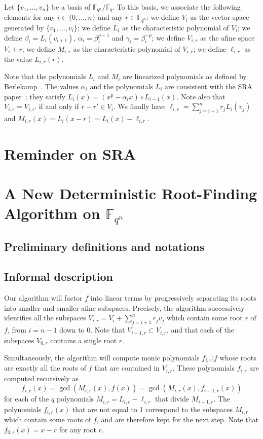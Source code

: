 \documentclass{sig-alternate}
\newcommand{\ff}[1]{\mathbb{F}_{#1}}
\newcommand{\fq}{\ff{q}}
\newcommand{\fqn}{\ff{q^n}}
\newcommand{\basefsize}{q}
\newcommand{\extfdegree}{n}
\newcommand{\extfsize}{\basefsize^\extfdegree}
\newcommand{\extf}{\ff{\extfsize}}
\newcounter{algo}
\begin{document}
Let $\{v_1,\ldots,v_\extfdegree\}$ be a basis of $\fqn/\fq$. To this basis, we associate the following elements for any $i\in\{0,\ldots,\extfdegree\}$ and any $r\in\fqn$: 
we define $V_i$ as the vector space generated by $\{v_1,\ldots,v_i\}$;
we define $L_i$ as the characteristic polynomial of $V_i$;
we define $\beta_i=L_i(v_{i+1})$, $\alpha_i=\beta_i^{p-1}$ and $\gamma_i=\beta_i^{-p}$;
we define $V_{i,r}$ as the afine space $V_i+r$;
we define $M_{i,r}$ as the characteristic polynomial of $V_{i,r}$;
we define $\ell_{i,r}$ as the value $L_{i,r}(r)$.

Note that the polynomials $L_i$ and $M_i$ are linearized polynomials as defined by Berlekamp~\cite[Ch. 11]{Berlekamp1984}. The values $\alpha_i$ and the polynomials $L_i$ are consistent with the SRA paper~\cite{cgUCL-P14}; they satisfy $L_i(x)=(x^p-\alpha_ix)\circ L_{i-1}(x)$.
%
Note also that $V_{i,r}=V_{i,r'}$ if and only if $r-r'\in V_i$.
%
We finally have
$\ell_{i,r}=\sum_{j=i+1}^nr_jL_i(v_{j})$
and 
$M_{i,r}(x)=L_i(x-r)=L_i(x)-\ell_{i,r}$.

\section{Reminder on SRA}

\section{A New Deterministic Root-Finding Algorithm on $\extf$}

\subsection{Preliminary definitions and notations}

\subsection{Informal description}

Our algorithm will factor $f$ into linear terms by progressively separating its roots into smaller and smaller afine subspaces. 
%
Precisely, the algorithm successively identifies all the subspaces $V_{i,r}=V_{i}+\sum_{j=i+1}^nr_jv_j$ which contain some root $r$ of $f$, from $i=n-1$ down to 0. Note that $V_{i-1,r}\subset V_{i,r}$, and that each of the subspaces $V_{0,r}$ contains a single root $r$.

Simultaneously, the algorithm will compute monic polynomials $f_{i,r}|f$ whose roots are exactly all the roots of $f$ that are contained in $V_{i,r}$. 
%
These polynomials $f_{i,r}$ are computed recursively as
$$f_{i,r}(x)=\gcd(M_{i,r}(x),f(x))
=\gcd(M_{i,r}(x),f_{i+1,r}(x))$$
for each of the $q$ polynomials $M_{i,r}=L_{i,r}-\ell_{i,r}$ that divide $M_{i+1,r}$. The polynomials $f_{i,r}(x)$ that are not equal to 1 correspond to the subspaces $M_{i,r}$ which contain some roots of $f$, and are therefore kept for the next step.
%
Note that $f_{0,r}(x)=x-r$ for any root $r$.
\end{document}
